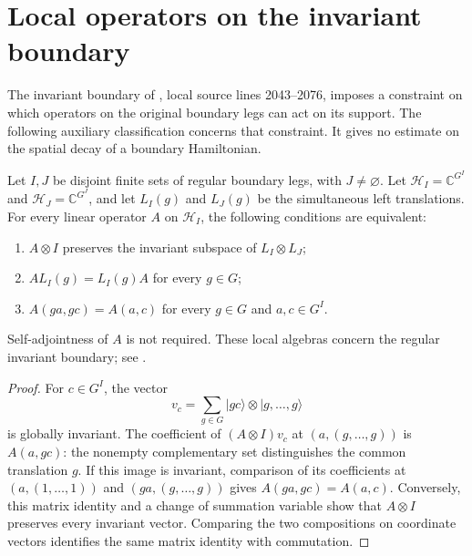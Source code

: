\section{Local operators on the invariant boundary}%
\label{sec:peps_regular_boundary_local_algebra}

The invariant boundary of \cite[Theorem~6.9]{Schuch2010PEPS},
local source lines 2043--2076, imposes a constraint on which
operators on the original boundary legs can act on its support.
The following auxiliary classification concerns that constraint.
It gives no estimate on the spatial decay of a boundary Hamiltonian.

\begin{lemma}%
    \label{thm:peps_regular_boundary_local_algebra}
    \leanok
    Let $I,J$ be disjoint finite sets of regular boundary legs,
    with $J\ne\varnothing$. Let $\mathcal H_I=\mathbb C^{G^I}$
    and $\mathcal H_J=\mathbb C^{G^J}$, and let $L_I(g)$ and
    $L_J(g)$ be the simultaneous left translations.
    For every linear operator $A$ on $\mathcal H_I$, the following
    conditions are equivalent:
    \begin{enumerate}
        \item $A\otimes I$ preserves the invariant subspace of
              $L_I\otimes L_J$;
        \item $A L_I(g)=L_I(g)A$ for every $g\in G$;
        \item $A(ga,gc)=A(a,c)$ for every $g\in G$ and $a,c\in G^I$.
    \end{enumerate}
    Self-adjointness of $A$ is not required.
    These local algebras concern the regular invariant boundary; see
    \cite{gap:rmp_peps_quantum_double_g_isometry}.
\end{lemma}

\begin{proof}\leanok
    For $c\in G^I$, the vector
    \[
        v_c=\sum_{g\in G}|gc\rangle\otimes|g,\ldots,g\rangle
    \]
    is globally invariant. The coefficient of
    $(A\otimes I)v_c$ at $(a,(g,\ldots,g))$ is $A(a,gc)$:
    the nonempty complementary set distinguishes the common
    translation $g$. If this image is invariant, comparison of
    its coefficients at $(a,(1,\ldots,1))$ and
    $(ga,(g,\ldots,g))$ gives $A(ga,gc)=A(a,c)$.
    Conversely, this matrix identity and a change of summation
    variable show that $A\otimes I$ preserves every invariant
    vector. Comparing the two compositions on coordinate vectors
    identifies the same matrix identity with commutation.
\end{proof}

